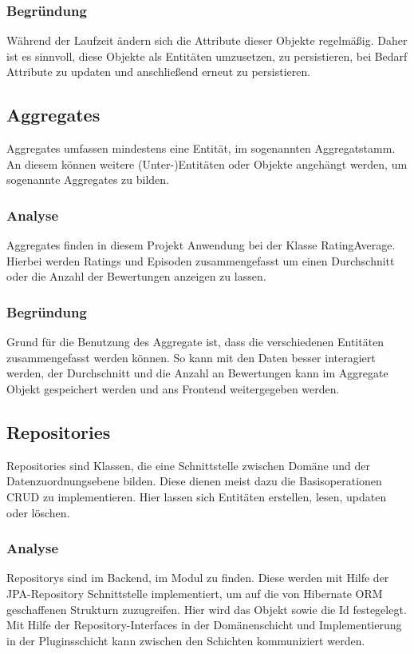         \subsubsection{Begründung}
         Während der Laufzeit ändern sich die Attribute dieser Objekte regelmäßig. Daher ist es sinnvoll, diese Objekte als Entitäten umzusetzen, zu persistieren, bei Bedarf Attribute zu updaten und anschließend erneut zu persistieren.

    \subsection{Aggregates} \label{1.aggregate}
    Aggregates umfassen mindestens eine Entität, im sogenannten Aggregatstamm. An diesem können weitere (Unter-)Entitäten oder Objekte angehängt werden, um sogenannte Aggregates zu bilden.

        \subsubsection{Analyse}
        Aggregates finden in diesem Projekt Anwendung bei der Klasse RatingAverage. Hierbei werden Ratings und Episoden zusammengefasst um einen Durchschnitt oder die Anzahl der Bewertungen anzeigen zu lassen.
        
        \subsubsection{Begründung}
        Grund für die Benutzung des Aggregate ist, dass die verschiedenen Entitäten zusammengefasst werden können. So kann mit den Daten besser interagiert werden, der Durchschnitt und die Anzahl an Bewertungen kann im Aggregate Objekt gespeichert werden und ans Frontend weitergegeben werden.

    \subsection{Repositories} \label{1.repo}
    Repositories sind Klassen, die eine Schnittstelle zwischen Domäne und der Datenzuordnungsebene bilden. Diese dienen meist dazu die Basisoperationen CRUD zu implementieren. Hier lassen sich Entitäten erstellen, lesen, updaten oder löschen.
    
        \subsubsection{Analyse}
        Repositorys sind im Backend, im Modul  zu finden. Diese werden mit Hilfe der JPA-Repository Schnittstelle implementiert, um auf die von Hibernate ORM geschaffenen Strukturn zuzugreifen. Hier wird das Objekt sowie die Id festegelegt. Mit Hilfe der Repository-Interfaces in der Domänenschicht und Implementierung in der Pluginsschicht kann zwischen den Schichten kommuniziert werden.

